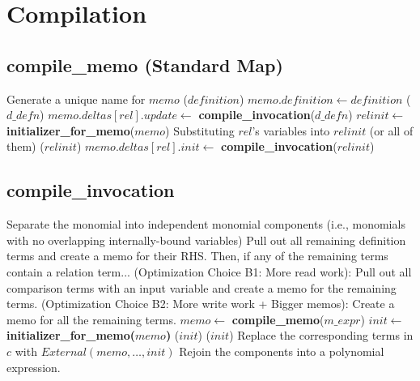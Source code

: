 \documentclass[11pt]{amsart}
\begin{document}
\section{Compilation}

\subsection{compile\_memo (Standard Map)}
\begin{algorithmic}
\STATE Generate a unique name for $memo$
($definition$)
\STATE $memo.definition \gets definition$
  ($d\_defn$)
  \STATE $memo.deltas[rel].update \gets$ {\bf compile\_invocation}($d\_defn$)
\ENDFOR
{}
  \STATE $relinit \gets$ {\bf initializer\_for\_memo}($memo$)
  \STATE Substituting $rel$'s variables into $relinit$ (or all of them)
  ($relinit$)
  \STATE $memo.deltas[rel].init \gets$ {\bf compile\_invocation}($relinit$)
\ENDFOR
\end{algorithmic}

\subsection{compile\_invocation}
\begin{algorithmic}
\STATE Separate the monomial into independent monomial components (i.e., monomials with no overlapping internally-bound variables)
  \STATE Pull out all remaining definition terms and create a memo for their RHS.  Then, if any of the remaining terms contain a relation term...
  \STATE (Optimization Choice B1: More read work): Pull out all comparison terms with an input variable and create a memo for the remaining terms.
  \STATE (Optimization Choice B2: More write work + Bigger memos): Create a memo for all the remaining terms.
    \STATE $memo \gets$ {\bf compile\_memo}($m\_expr$)
    \STATE $init \gets$ {\bf initializer\_for\_memo($memo$)}
    ($init$)
    ($init$)
    \STATE Replace the corresponding terms in $c$ with $External(memo, \ldots, init)$
  \ENDFOR
\ENDFOR
\STATE Rejoin the components into a polynomial expression.
\end{algorithmic}
\end{document}
